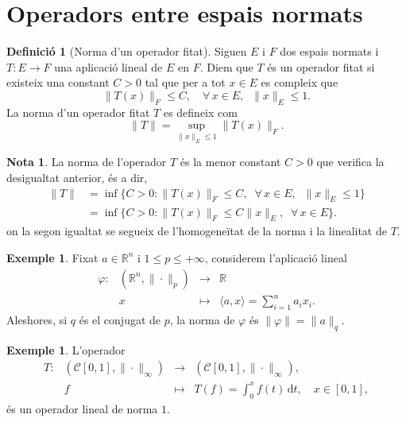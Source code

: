 \documentclass[12pt]{book}
\theoremstyle{definition}
\newtheorem{defi}[teorema]{Definició}
\theoremstyle{nota}
\newtheorem{nota}[teorema]{Nota}
\theoremstyle{exemple}
\newtheorem{exemple}[teorema]{Exemple}
\begin{document}
\section{Operadors entre espais normats}

\begin{defi}[Norma d'un operador fitat]
  Siguen $E$ i $F$ dos espais normats i $T : E \to F$ una aplicació
  lineal de $E$ en $F$. Diem que $T$ és un operador fitat si existeix
  una constant $C > 0$ tal que per a tot $x \in E$ es compleix que
  \[
    \|T(x)\|_F \leq C, \quad \forall\, x \in E, \;\; \|x\|_E \leq 1.
  \]
  La norma d'un operador fitat $T$ es defineix com
  \[
    \|T\| = \sup_{\|x\|_E \leq 1} \|T(x)\|_F.
  \]
\end{defi}

\begin{nota}
  La norma de l'operador $T$ és la menor constant $C > 0$ que verifica
  la desigualtat anterior, és a dir,
  \begin{align*}
    \|T\| &= \inf\{C > 0 : \|T(x)\|_F \leq C, \;\; \forall\, x \in E, \;\; \|x\|_E \leq 1\} \\
          &= \inf\{C > 0 : \|T(x)\|_F \leq C \|x\|_E, \;\; \forall\, x \in E\}.
  \end{align*}
  on la segon igualtat se segueix de l'homogeneïtat de la norma i la
  linealitat de $T$.
\end{nota}

\begin{exemple}
  Fixat $a \in \mathbb{R}^n$ i $1 \leq p \leq +\infty$, considerem
  l'aplicació lineal
  \begin{equation*}
    \begin{array}{lrcl}
      \varphi : & (\mathbb{R}^n, \|\cdot\|_p) &\longrightarrow& \mathbb{R} \\
      & x &\longmapsto& \langle a, x \rangle = \sum\limits_{i=1}^{n}a_ix_i.
    \end{array}
  \end{equation*}
  Aleshores, si $q$ és el conjugat de $p$, la norma de $\varphi$ és
  $\|\varphi\| = \|a\|_q$.
\end{exemple}

\begin{exemple}
  L'operador
  \[
    \begin{array}{lrcl}
      T : & (\mathcal{C}[0,1], \|\cdot\|_\infty) &\longrightarrow& (\mathcal{C}[0,1], \|\cdot\|_\infty), \\
      & f &\longmapsto& T(f) = \int_0^x f(t)\, \mathrm{d}t, \quad x \in [0,1],
    \end{array}
  \]
  és un operador lineal de norma $1$.
\end{exemple}
\end{document}
